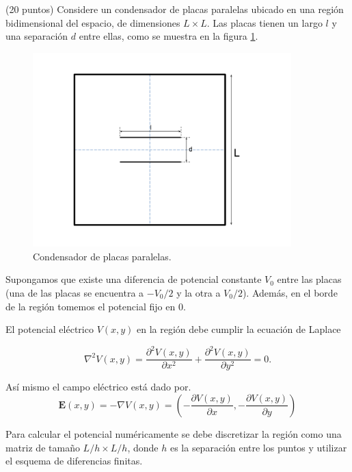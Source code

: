 \documentclass[11pt,letterpaper]{exam}
\begin{document}
\begin{questions}





(20 puntos) Considere un condensador de placas paralelas ubicado
en una regi\'on bidimensional del espacio, de dimensiones $L\times
L$. Las placas tienen un largo $l$ y una separaci\'on $d$ entre ellas, como se
muestra en la figura \ref{fig:gridplates}. 

\begin{figure}[H]
  \centering
  \includegraphics[width=10cm]{gridplates}
  \caption{\label{fig:gridplates} Condensador de placas paralelas.}
\end{figure}

Supongamos que existe una diferencia de potencial constante $V_0$
entre las placas (una de las placas se encuentra a $-V_0/2$ y la otra
a $V_0/2$). Adem\'as, en el borde de la regi\'on tomemos el potencial
fijo en $0$. 

El potencial el\'ectrico $V(x,y)$ en la regi\'on debe cumplir la
ecuaci\'on de Laplace 

\begin{equation}
 \nabla^2V(x,y) = \frac{\partial^2 V(x,y)}{\partial x^2} +
 \frac{\partial^2 V(x,y)}{\partial y^2}=0. 
\end{equation}

As\'i mismo el campo el\'ectrico est\'a dado por.
\begin{equation}
\mathbf{E}(x,y) = -\nabla V(x,y) = \left(-\frac{\partial V(x,y)}{\partial x}, -\frac{\partial V(x,y)}{\partial y}\right)
\end{equation}

Para calcular el potencial num\'ericamente se debe discretizar la
regi\'on como una matriz de tama\~no $L/h \times L/h$, donde $h$ es la
separaci\'on entre los puntos y utilizar el esquema de diferencias
finitas. 


\end{questions}
\end{document}
